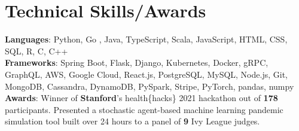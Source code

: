 \documentclass[letterpaper,11pt]{article}
\begin{document}
%
\section{Technical Skills/Awards}
 \begin{itemize}[leftmargin=0.15in, label={}]
    \small{\item{
     \textbf{Languages}{: Python, Go , Java, TypeScript, Scala, JavaScript, HTML, CSS, SQL, R, C, C++} \\
     \textbf{Frameworks}{: Spring Boot, Flask, Django, Kubernetes, Docker, gRPC, GraphQL, AWS, Google Cloud, React.js, PostgreSQL, MySQL, Node.js, Git, MongoDB, Cassandra, DynamoDB, PySpark, Stripe, PyTorch, pandas, numpy} \\
     \textbf{Awards}{: Winner of \textbf{Stanford}'s health\{hacks\} 2021 hackathon out of \textbf{178} participants. Presented a stochastic agent-based machine learning pandemic simulation tool built over 24 hours to a panel of \textbf{9} Ivy League judges.} \\
    }}

 \end{itemize}



\end{document}
